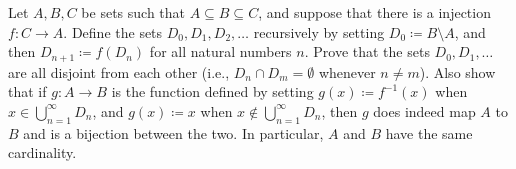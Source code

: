 \begin{ex}\label{i:ex:8.3.2}
  Let \(A, B, C\) be sets such that \(A \subseteq B \subseteq C\), and suppose that there is a injection \(f : C \to A\).
  Define the sets \(D_0, D_1, D_2, \dots\) recursively by setting \(D_0 \coloneqq B \setminus A\), and then \(D_{n + 1} \coloneqq f(D_n)\) for all natural numbers \(n\).
  Prove that the sets \(D_0, D_1, \dots\) are all disjoint from each other
  (i.e., \(D_n \cap D_m = \emptyset\) whenever \(n \neq m\)).
  Also show that if \(g : A \to B\) is the function defined by setting \(g(x) \coloneqq f^{-1}(x)\) when \(x \in \bigcup_{n = 1}^\infty D_n\), and \(g(x) \coloneqq x\) when \(x \notin \bigcup_{n = 1}^\infty D_n\), then \(g\) does indeed map \(A\) to \(B\) and is a bijection between the two.
  In particular, \(A\) and \(B\) have the same cardinality.
\end{ex}

